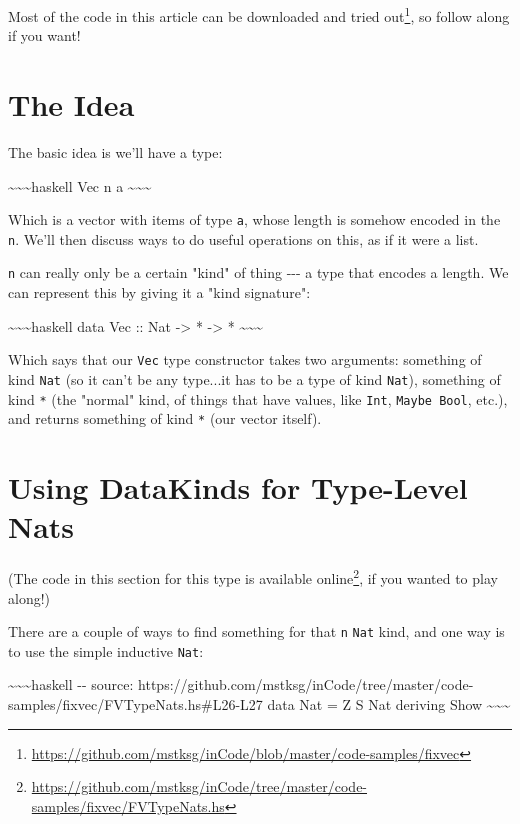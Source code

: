 \documentclass[]{article}
\renewcommand{\href}[2]{#2\footnote{\url{#1}}}
\begin{document}
Most of the code in this article can be
\href{https://github.com/mstksg/inCode/blob/master/code-samples/fixvec}{downloaded
and tried out}, so follow along if you want!

\section{The Idea}

The basic idea is we'll have a type:

\textasciitilde{}\textasciitilde{}\textasciitilde{}haskell Vec n a
\textasciitilde{}\textasciitilde{}\textasciitilde{}

Which is a vector with items of type \texttt{a}, whose length is somehow encoded
in the \texttt{n}. We'll then discuss ways to do useful operations on this, as
if it were a list.

\texttt{n} can really only be a certain "kind" of thing -\/-\/- a type that
encodes a length. We can represent this by giving it a "kind signature":

\textasciitilde{}\textasciitilde{}\textasciitilde{}haskell data Vec :: Nat
-\textgreater{} * -\textgreater{} *
\textasciitilde{}\textasciitilde{}\textasciitilde{}

Which says that our \texttt{Vec} type constructor takes two arguments: something
of kind \texttt{Nat} (so it can't be any type...it has to be a type of kind
\texttt{Nat}), something of kind \texttt{*} (the "normal" kind, of things that
have values, like \texttt{Int}, \texttt{Maybe\ Bool}, etc.), and returns
something of kind \texttt{*} (our vector itself).

\section{Using DataKinds for Type-Level Nats}

(The code in this section for this type is
\href{https://github.com/mstksg/inCode/tree/master/code-samples/fixvec/FVTypeNats.hs}{available
online}, if you wanted to play along!)

There are a couple of ways to find something for that \texttt{n} \texttt{Nat}
kind, and one way is to use the simple inductive \texttt{Nat}:

\textasciitilde{}\textasciitilde{}\textasciitilde{}haskell -\/- source:
https://github.com/mstksg/inCode/tree/master/code-samples/fixvec/FVTypeNats.hs\#L26-L27
data Nat = Z \textbar{} S Nat deriving Show
\textasciitilde{}\textasciitilde{}\textasciitilde{}
\end{document}
